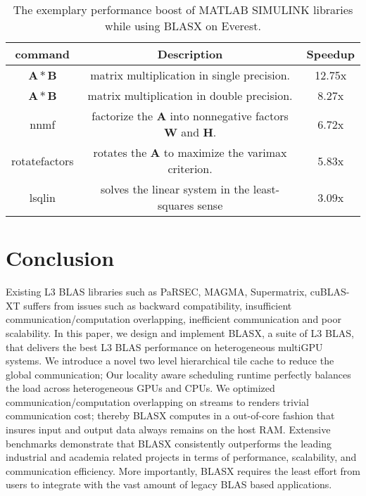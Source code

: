 \documentclass[conference]{IEEEtran}
\begin{document}
\begin{inparaenum} 
\begin{table}[t]
\centering
\caption{The exemplary performance boost of MATLAB SIMULINK libraries while using BLASX on Everest.}
\label{MATLAB}
\begin{tabular}{c c c}
     \toprule
      command     &  Description                &   Speedup                         \\  \midrule
      $\mathbf{A}*\mathbf{B}$ & matrix multiplication in single precision. & 12.75x \\
      $\mathbf{A}*\mathbf{B}$ & matrix multiplication in double precision. & 8.27x  \\
      nnmf     & factorize the $\mathbf{A}$ into nonnegative factors $\mathbf{W}$ and $\mathbf{H}$. & 6.72x       \\ 
      rotatefactors  & rotates the $\mathbf{A}$ to maximize the varimax criterion.      & 5.83x                   \\
      lsqlin   & solves the linear system in the least-squares sense & 3.09x \\
    \bottomrule
\end{tabular}
\vspace{-0.2in}
\end{table}


\end{inparaenum}


\section{Conclusion}
Existing L3 BLAS libraries such as PaRSEC, MAGMA, Supermatrix, cuBLAS-XT suffers from issues such as backward compatibility,
insufficient communication/computation overlapping, inefficient communication and poor scalability. In this paper, 
we design and implement BLASX, a suite of L3 BLAS, that delivers the best L3 BLAS performance on heterogeneous multiGPU systems. 
We introduce a novel two level hierarchical tile cache to reduce the global communication; Our locality aware scheduling 
runtime perfectly balances the load across heterogeneous GPUs and CPUs. We optimized communication/computation 
overlapping on streams to renders trivial communication cost; thereby BLASX computes in a out-of-core fashion that insures input and output 
data always remains on the host RAM. Extensive benchmarks demonstrate that BLASX consistently outperforms the leading industrial and academia related projects
in terms of performance, scalability, and communication efficiency. More importantly, BLASX requires the least effort from users to integrate with
the vast amount of legacy BLAS based applications.
\end{document}
